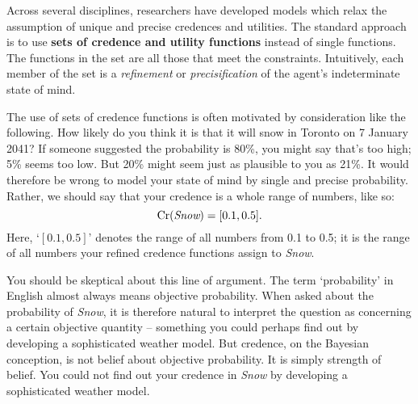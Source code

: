Across several disciplines, researchers have developed models which
relax the assumption of unique and precise credences and utilities.
The standard approach is to use \textbf{sets of credence and utility
  functions} instead of single functions. The functions in the set are
all those that meet the constraints. Intuitively, each member of the
set is a \emph{refinement} or \emph{precisification} of the agent's
indeterminate state of mind.

The use of sets of credence functions is often motivated by
consideration like the following. How likely do you think it is that
it will snow in Toronto on 7 January 2041? If someone suggested the
probability is 80\%, you might say that's too high; 5\% seems too
low. But 20\% might seem just as plausible to you as 21\%. It would
therefore be wrong to model your state of mind by single and precise
probability. Rather, we should say that your credence is a whole range
of numbers, like so:
\[
\text{Cr}(\emph{Snow}) = [0.1, 0.5].
\]
Here, `$[0.1, 0.5]$' denotes the range of all numbers from 0.1 to 0.5;
it is the range of all numbers your refined credence functions assign
to \emph{Snow}.


You should be skeptical about this line of argument. The term
`probability' in English almost always means objective
probability. When asked about the probability of \emph{Snow}, it is
therefore natural to interpret the question as concerning a certain
objective quantity -- something you could perhaps find out by
developing a sophisticated weather model. But credence, on the
Bayesian conception, is not belief about objective probability. It is
simply strength of belief. You could not find out your credence in
\emph{Snow} by developing a sophisticated weather model.

